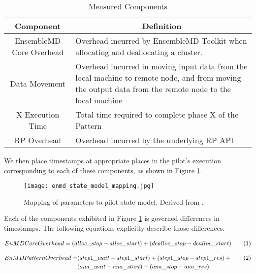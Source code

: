 \documentclass[]{article}
\newcommand\numberthis{\addtocounter{equation}{1}\tag{\theequation}}
\begin{document}
			\begin{table}[H]
				\centering
				\begin{tabular}{|c|p{10cm}|}
						\hline
						Component & \multicolumn{1}{|c|}{Definition} \\
						\hline
						\hline
						EnsembleMD Core Overhead & Overhead incurred by EnsembleMD Toolkit when allocating and deallocating a cluster. \\
						\hline
						Data Movement &  Overhead incurred in moving input data from the local machine to remote node, and from moving the output data from the remote node to the local machine\\
						\hline
						X Execution Time & Total time required to complete phase X of the Pattern\\
						\hline
						RP Overhead & Overhead incurred by the underlying RP API \\
						\hline
				\end{tabular}
				\caption{Measured Components}
				\label{table:measured_components}
			\end{table}

			We then place timestamps at appropriate places in the pilot's execution corresponding to each of these components, as shown in Figure \ref{fig:param_pilot_state_mapping}.

			\begin{figure}[H]
				\centering
				\texttt{[image: enmd\_state\_model\_mapping.jpg]}
				\caption{Mapping of parameters to pilot state model. Derived from \cite{rp_state_diagram}.}
				\label{fig:param_pilot_state_mapping}
			\end{figure}


			Each of the components exhibited in Figure \ref{fig:param_pilot_state_mapping} is governed differences in timestamps. The following equations explicitly describe those differences.

			\begin{align*}
				EnMD Core Overhead = (alloc\_stop - alloc\_start) + (dealloc\_stop - dealloc\_start) \numberthis \label{1}
			\end{align*}

			\begin{align*}
				EnMD Pattern Overhead = &(step1\_wait-step1\_start) + (step1\_stop - step1\_res) + \numberthis \label{2} \\
										&(ana\_wait-ana\_start) + (ana\_stop - ana\_res) 
			\end{align*}
\end{document}

